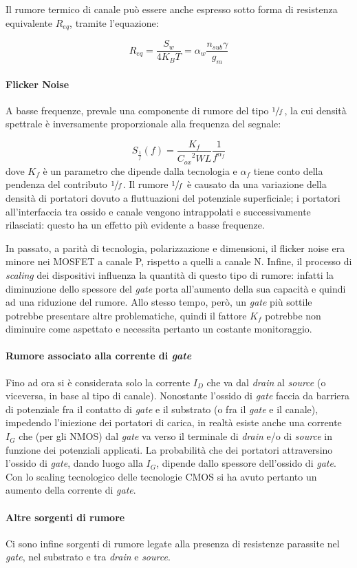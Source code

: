 Il rumore termico di canale può essere anche espresso sotto forma di resistenza equivalente $R_{eq}$, tramite l'equazione:

\begin{equation}
  R_{eq} = \frac{S_w}{4 K_B T} = \alpha_w \frac{n_{sub} \gamma}{g_m}
\end{equation}

\paragraph*{Flicker Noise}
A basse frequenze, prevale una componente di rumore del tipo $\sfrac{1}{f}$, la cui densità spettrale è inversamente proporzionale alla frequenza del segnale:

\begin{equation}
  S_{\frac{1}{f}} \left(f\right) = \frac{K_f}{{C_{ox}}^2 W L} \frac{1}{f^{\alpha_f}}
\end{equation}
dove $K_f$ è un parametro che dipende dalla tecnologia e $\alpha_f$ tiene conto della pendenza del contributo $\sfrac{1}{f}$.
Il rumore $\sfrac{1}{f}$ è causato da una variazione della densità di portatori dovuto a fluttuazioni del potenziale superficiale; i portatori all'interfaccia tra ossido e canale vengono intrappolati e successivamente rilasciati: questo ha un effetto più evidente a basse frequenze.

In passato, a parità di tecnologia, polarizzazione e dimensioni, il flicker noise era minore nei MOSFET a canale P, rispetto a quelli a canale N. Infine, il processo di \emph{scaling} dei dispositivi influenza la quantità di questo tipo di rumore: infatti la diminuzione dello spessore del \emph{gate} porta all'aumento della sua capacità e quindi ad una riduzione del rumore. Allo stesso tempo, però, un \emph{gate} più sottile potrebbe presentare altre problematiche, quindi il fattore $K_f$ potrebbe non diminuire come aspettato e necessita pertanto un costante monitoraggio. 

\paragraph*{Rumore associato alla corrente di \textit{gate}}
Fino ad ora si è considerata solo la corrente $I_D$ che va dal \emph{drain} al \emph{source} (o viceversa, in base al tipo di canale). Nonostante l'ossido di \textit{gate} faccia da barriera di potenziale fra il contatto di \textit{gate} e il substrato (o fra il \textit{gate} e il canale), impedendo l'iniezione dei portatori di carica, in realtà esiste anche una corrente $I_G$ che (per gli NMOS) dal \textit{gate} va verso il terminale di \textit{drain} e/o di \textit{source} in funzione dei potenziali applicati. La probabilità che dei portatori attraversino l'ossido di \textit{gate}, dando luogo alla $I_G$, dipende dallo spessore dell'ossido di \textit{gate}. Con lo scaling tecnologico delle tecnologie CMOS si ha avuto pertanto un aumento della corrente di \textit{gate}.

\paragraph*{Altre sorgenti di rumore}
Ci sono infine sorgenti di rumore legate alla presenza di resistenze parassite nel \emph{gate}, nel substrato e tra \emph{drain} e \emph{source}.